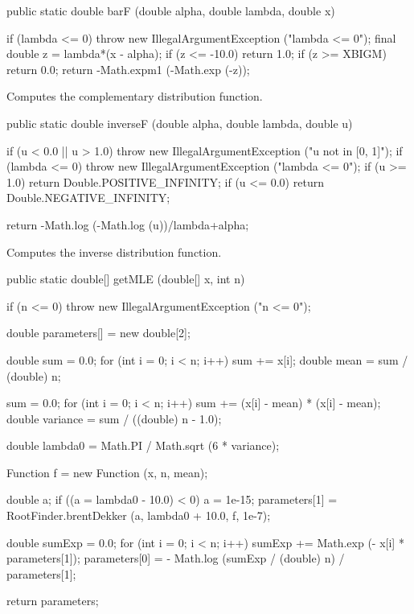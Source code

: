 \begin{code}

   public static double barF (double alpha, double lambda, double x)\begin{hide} {
      if (lambda <= 0)
         throw new IllegalArgumentException ("lambda <= 0");
      final double z = lambda*(x - alpha);
      if (z <= -10.0)
         return 1.0;
      if (z >= XBIGM)
         return 0.0;
      return -Math.expm1 (-Math.exp (-z));
   }\end{hide}
\end{code}
 \begin{tabb}
  Computes  the complementary distribution function.
 \end{tabb}
\begin{code}

   public static double inverseF (double alpha, double lambda, double u)\begin{hide} {
       if (u < 0.0 || u > 1.0)
          throw new IllegalArgumentException ("u not in [0, 1]");
      if (lambda <= 0)
         throw new IllegalArgumentException ("lambda <= 0");
       if (u >= 1.0)
           return Double.POSITIVE_INFINITY;
       if (u <= 0.0)
           return Double.NEGATIVE_INFINITY;

       return -Math.log (-Math.log (u))/lambda+alpha;
   }\end{hide}
\end{code}
  \begin{tabb}
  Computes the inverse distribution function.
 \end{tabb}
\begin{code}

   public static double[] getMLE (double[] x, int n)\begin{hide} {
      if (n <= 0)
         throw new IllegalArgumentException ("n <= 0");

      double parameters[] = new double[2];

      double sum = 0.0;
      for (int i = 0; i < n; i++)
         sum += x[i];
      double mean = sum / (double) n;

      sum = 0.0;
      for (int i = 0; i < n; i++)
         sum += (x[i] - mean) * (x[i] - mean);
      double variance = sum / ((double) n - 1.0);

      double lambda0 = Math.PI / Math.sqrt (6 * variance);

      Function f = new Function (x, n, mean);

      double a;
      if ((a = lambda0 - 10.0) < 0)
         a = 1e-15;
      parameters[1] = RootFinder.brentDekker (a, lambda0 + 10.0, f, 1e-7);

      double sumExp = 0.0;
      for (int i = 0; i < n; i++)
         sumExp += Math.exp (- x[i] * parameters[1]);
      parameters[0] = - Math.log (sumExp / (double) n) / parameters[1];

      return parameters;
   }\end{hide}
\end{code}
